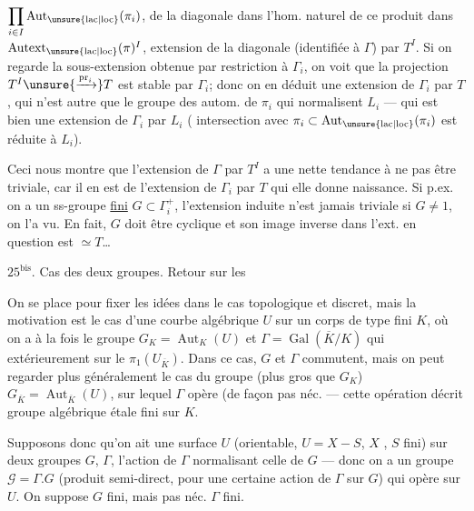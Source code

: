 $\displaystyle\prod_{i\in I}\operatorname{Aut}_{\unsure{\mathrm{lac}|\mathrm{loc}}}(\pi_i)$,
  de la diagonale
dans l'hom. naturel de ce produit dans
$\operatorname{Autext}_{\unsure{\mathrm{lac}|\mathrm{loc}}}(\pi)^I$,   extension de
la diagonale (identifiée à $\Gamma$) par $T^I$.
Si on regarde la sous-extension  obtenue
par restriction à $\Gamma_i$, on voit que la
projection $T^I\unsure{\xrightarrow{\mathrm{pr}_i}}T$ est stable par $\Gamma_i$; donc
on en déduit une extension de $\Gamma_i$ par $T$,
qui n'est autre que le groupe des
autom.  de $\pi_i$ qui normalisent $L_i$
--- qui est bien une extension de $\Gamma_i$ par $L_i$
( intersection avec $\pi_i\subset\operatorname{Aut}_{\unsure{\mathrm{lac}|\mathrm{loc}}}(\pi_i)$ est
réduite à $L_i$).

Ceci nous montre que l'extension
de $\Gamma$ par $T^I$ a une nette tendance à
ne pas être triviale, car il en est 
 de l'extension de $\Gamma_i$ par $T$  qui elle donne
naissance. Si p.ex. on a un ss-groupe
\uline{fini} $G\subset\Gamma_i^+$, l'extension induite n'est
jamais triviale si $G\ne1$, on l'a vu. En
fait, $G$ doit être cyclique et son image inverse
dans l'ext. en question est $\simeq T$\ldots
{}

$25^{\mathrm{bis}}$. Cas des deux groupes. Retour sur les 

On se place  pour fixer les idées dans le cas
topologique et discret, mais la motivation est
le cas d'une courbe algébrique $U$ sur un
corps de type fini $K$, où on a à la fois
le groupe $G_K=\operatorname{Aut}_K(U)$ et $\Gamma=\operatorname{Gal}(\overline K/K)$
qui  extérieurement sur le $\pi_1(U_{\overline K})$.
Dans ce cas, $G$ et $\Gamma$ commutent, mais
on peut regarder plus généralement le cas
du groupe (plus gros que $G_K$) $G_{\overline K}=\operatorname{Aut}_{\overline K}(U)$,
sur lequel $\Gamma$ opère (de façon pas néc. 
--- cette opération décrit  groupe algébrique
étale fini sur $K$.

Supposons donc qu'on ait une surface
$U$ (orientable, $U=X-S$, $X$  , $S$ fini)
sur   deux groupes $G$, $\Gamma$,
l'action de $\Gamma$ normalisant celle de $G$
--- donc on a un groupe $\mathcal G=\Gamma . G$ (produit
semi-direct, pour une certaine action de $\Gamma$
sur $G$) qui opère sur $U$. On suppose $G$
fini, mais pas néc. $\Gamma$ fini.

